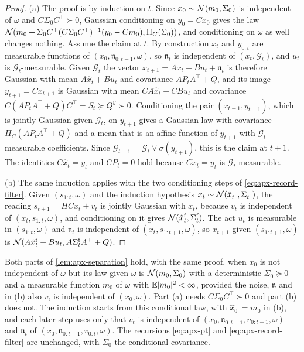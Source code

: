 \begin{proof}
(a) The proof is by induction on $t$. Since $x_0\sim\mathcal{N}(m_0,\Sigma_0)$ is independent of $\omega$ and $C\Sigma_0C^\top\succ0$, Gaussian conditioning on $y_0=Cx_0$ gives the law $\mathcal{N}(m_0+\Sigma_0C^\top(C\Sigma_0C^\top)^{-1}(y_0-Cm_0),\Pi_C(\Sigma_0))$, and conditioning on $\omega$ as well changes nothing. Assume the claim at $t$. By construction $x_t$ and $y_{0:t}$ are measurable functions of $(x_0,\mathfrak n_{0:t-1},\omega)$, so $\mathfrak n_t$ is independent of $(x_t,\mathcal G_t)$, and $u_t$ is $\mathcal G_t$-measurable. Given $\mathcal G_t$ the vector $x_{t+1}=Ax_t+Bu_t+\mathfrak n_t$ is therefore Gaussian with mean $A\hat x_t+Bu_t$ and covariance $AP_tA^\top+Q$, and its image $y_{t+1}=Cx_{t+1}$ is Gaussian with mean $CA\hat x_t+CBu_t$ and covariance $C(AP_tA^\top+Q)C^\top=S_t\succeq Q^y\succ0$. Conditioning the pair $(x_{t+1},y_{t+1})$, which is jointly Gaussian given $\mathcal G_t$, on $y_{t+1}$ gives a Gaussian law with covariance $\Pi_C(AP_tA^\top+Q)$ and a mean that is an affine function of $y_{t+1}$ with $\mathcal G_t$-measurable coefficients. Since $\mathcal G_{t+1}=\mathcal G_t\vee\sigma(y_{t+1})$, this is the claim at $t+1$. The identities $C\hat x_t=y_t$ and $CP_t=0$ hold because $Cx_t=y_t$ is $\mathcal G_t$-measurable.

(b) The same induction applies with the two conditioning steps of \cref{eq:apx-record-filter}. Given $(s_{1:t},\omega)$ and the induction hypothesis $x_t\sim\mathcal{N}(\hat x^-_t,\Sigma^-_t)$, the reading $s_{t+1}=HCx_t+v_t$ is jointly Gaussian with $x_t$, because $v_t$ is independent of $(x_t,s_{1:t},\omega)$, and conditioning on it gives $\mathcal{N}(\hat x^{\mathrm f}_t,\Sigma^{\mathrm f}_t)$. The act $u_t$ is measurable in $(s_{1:t},\omega)$ and $\mathfrak n_t$ is independent of $(x_t,s_{1:t+1},\omega)$, so $x_{t+1}$ given $(s_{1:t+1},\omega)$ is $\mathcal{N}(A\hat x^{\mathrm f}_t+Bu_t,A\Sigma^{\mathrm f}_tA^\top+Q)$.
\end{proof}

\begin{remark}\label{rem:apx-separation-start}
Both parts of \cref{lem:apx-separation} hold, with the same proof, when $x_0$ is not independent of $\omega$ but its law given $\omega$ is $\mathcal{N}(m_0,\Sigma_0)$ with a deterministic $\Sigma_0\succeq0$ and a measurable function $m_0$ of $\omega$ with $\mathbb{E}\lvert m_0\rvert^2<\infty$, provided the noise, $\mathfrak n$ and in (b) also $v$, is independent of $(x_0,\omega)$. Part (a) needs $C\Sigma_0C^\top\succ0$ and part (b) does not. The induction starts from this conditional law, with $\hat x^-_0=m_0$ in (b), and each later step uses only that $v_t$ is independent of $(x_0,\mathfrak n_{0:t-1},v_{0:t-1},\omega)$ and $\mathfrak n_t$ of $(x_0,\mathfrak n_{0:t-1},v_{0:t},\omega)$. The recursions \cref{eq:apx-pt} and \cref{eq:apx-record-filter} are unchanged, with $\Sigma_0$ the conditional covariance.
\end{remark}

